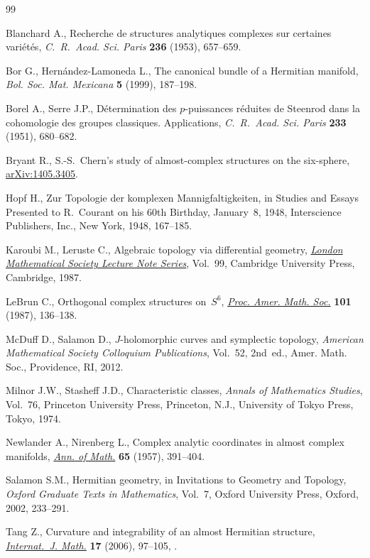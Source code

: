 \documentclass[pdftex]{sigma}
\numberwithin{equation}{section}
\begin{document}
\begin{thebibliography}{99}
\footnotesize\itemsep=0pt

Blanchard A., Recherche de structures analytiques complexes sur certaines
 vari\'et\'es, \textit{C.~R.~Acad. Sci. Paris} \textbf{236} (1953), 657--659.

Bor G., Hern\'andez-Lamoneda L., The canonical bundle of a {H}ermitian
 manifold, \textit{Bol. Soc. Mat. Mexicana} \textbf{5} (1999), 187--198.

Borel A., Serre J.P., D\'etermination des {$p$}-puissances r\'eduites de
 {S}teenrod dans la cohomologie des groupes classiques. {A}pplications,
 \textit{C.~R.~Acad. Sci. Paris} \textbf{233} (1951), 680--682.

Bryant R., {S}.-{S}.~{C}hern's study of almost-complex structures on the
 six-sphere, \href{https://arxiv.org/abs/1405.3405}{arXiv:1405.3405}.

Hopf H., Zur {T}opologie der komplexen {M}annigfaltigkeiten, in Studies and
 {E}ssays {P}resented to {R}.~{C}ourant on his 60th {B}irthday, {J}anuary~8,
 1948, Interscience Publishers, Inc., New York, 1948, 167--185.

Karoubi M., Leruste C., Algebraic topology via differential geometry,
 \href{https://doi.org/10.1017/CBO9780511629372}{\textit{London Mathematical Society Lecture Note Series}}, Vol.~99, Cambridge
 University Press, Cambridge, 1987.

LeBrun C., Orthogonal complex structures on~{$S^6$}, \href{https://doi.org/10.2307/2046564}{\textit{Proc. Amer. Math.
 Soc.}} \textbf{101} (1987), 136--138.

McDuff D., Salamon D., {$J$}-holomorphic curves and symplectic topology,
 \textit{American Mathematical Society Colloquium Publications}, Vol.~52, 2nd~ed., Amer. Math. Soc., Providence, RI, 2012.

Milnor J.W., Stasheff J.D., Characteristic classes, \textit{Annals of
 Mathematics Studies}, Vol.~76, Princeton University Press, Princeton, N.J.,
 University of Tokyo Press, Tokyo, 1974.

Newlander A., Nirenberg L., Complex analytic coordinates in almost complex
 manifolds, \href{https://doi.org/10.2307/1970051}{\textit{Ann. of Math.}} \textbf{65} (1957), 391--404.

Salamon S.M., Hermitian geometry, in Invitations to Geometry and Topology,
 \textit{Oxford Graduate Texts in Mathematics}, Vol.~7, Oxford University
 Press, Oxford, 2002, 233--291.

Tang Z., Curvature and integrability of an almost {H}ermitian structure,
 \href{https://doi.org/10.1142/S0129167X0600331X}{\textit{Internat.~J. Math.}} \textbf{17} (2006), 97--105,
.

\end{thebibliography}\LastPageEnding
\end{document}
